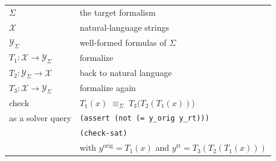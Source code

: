 \documentclass[border=8pt]{standalone}
\begin{document}
\Large
\renewcommand{\arraystretch}{1.3}
\begin{tabular}{@{}l@{\qquad}l@{}}
\toprule
$\Sigma$ & the target formalism \\
$\mathcal{X}$ & natural-language strings \\
$\mathcal{Y}_{\Sigma}$ & well-formed formulas of $\Sigma$ \\
\midrule
$T_1 : \mathcal{X} \rightarrow \mathcal{Y}_{\Sigma}$ & formalize \\
$T_2 : \mathcal{Y}_{\Sigma} \rightarrow \mathcal{X}$ & back to natural language \\
$T_3 : \mathcal{X} \rightarrow \mathcal{Y}_{\Sigma}$ & formalize again \\
\midrule
check & $T_1(x) \;\equiv_{\Sigma}\; T_3\big(T_2(T_1(x))\big)$ \\
as a solver query & \texttt{(assert (not (= y\_orig y\_rt)))} \\
 & \texttt{(check-sat)} \\
 & \textcolor{black!60}{with $y^{\mathrm{orig}} = T_1(x)$ and $y^{\mathrm{rt}} = T_3(T_2(T_1(x)))$} \\
\bottomrule
\end{tabular}
\end{document}
